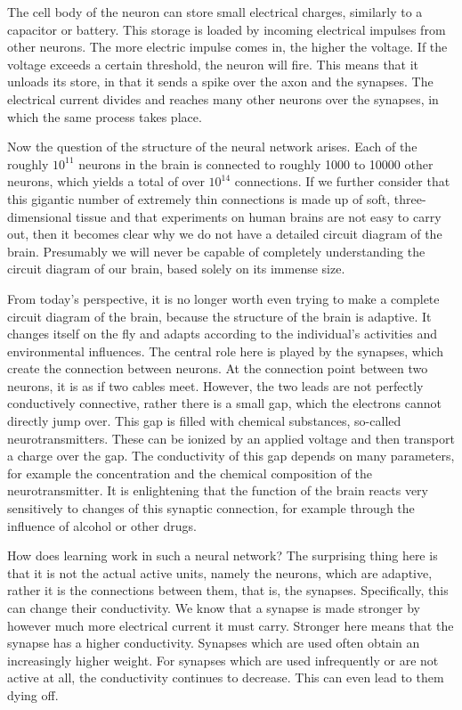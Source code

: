 \documentclass[10pt]{book}
\begin{document}
\begin{center}
\begin{enumerate}
\begin{center}
\begin{center}
\begin{center}
The cell body of the neuron can store small electrical charges, similarly to a capacitor or battery. This storage is loaded by incoming electrical impulses from other neurons. The more electric impulse comes in, the higher the voltage. If the voltage exceeds a certain threshold, the neuron will fire. This means that it unloads its store, in that it sends a spike over the axon and the synapses. The electrical current divides and reaches many other neurons over the synapses, in which the same process takes place.

Now the question of the structure of the neural network arises. Each of the roughly $10^{11}$ neurons in the brain is connected to roughly 1000 to 10000 other neurons, which yields a total of over $10^{14}$ connections. If we further consider that this gigantic number of extremely thin connections is made up of soft, three-dimensional tissue and that experiments on human brains are not easy to carry out, then it becomes clear why we do not have a detailed circuit diagram of the\\
brain. Presumably we will never be capable of completely understanding the circuit diagram of our brain, based solely on its immense size.

From today's perspective, it is no longer worth even trying to make a complete circuit diagram of the brain, because the structure of the brain is adaptive. It changes itself on the fly and adapts according to the individual's activities and environmental influences. The central role here is played by the synapses, which create the connection between neurons. At the connection point between two neurons, it is as if two cables meet. However, the two leads are not perfectly conductively connective, rather there is a small gap, which the electrons cannot directly jump over. This gap is filled with chemical substances, so-called neurotransmitters. These can be ionized by an applied voltage and then transport a charge over the gap. The conductivity of this gap depends on many parameters, for example the concentration and the chemical composition of the neurotransmitter. It is enlightening that the function of the brain reacts very sensitively to changes of this synaptic connection, for example through the influence of alcohol or other drugs.

How does learning work in such a neural network? The surprising thing here is that it is not the actual active units, namely the neurons, which are adaptive, rather it is the connections between them, that is, the synapses. Specifically, this can change their conductivity. We know that a synapse is made stronger by however much more electrical current it must carry. Stronger here means that the synapse has a higher conductivity. Synapses which are used often obtain an increasingly higher weight. For synapses which are used infrequently or are not active at all, the conductivity continues to decrease. This can even lead to them dying off.


\end{center}
\end{center}
\end{center}
\end{enumerate}
\end{center}
\end{document}
